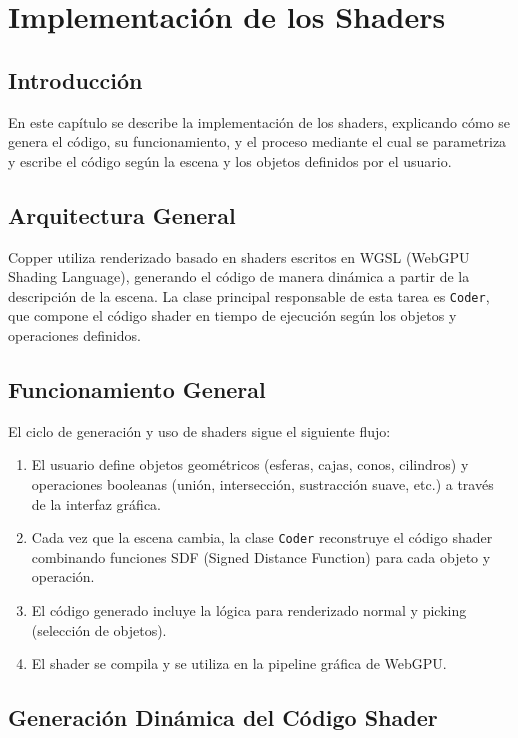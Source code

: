\chapter{Implementación de los Shaders}

\section{Introducción}

En este capítulo se describe la implementación de los shaders, explicando cómo
se genera el código, su funcionamiento, y el proceso mediante el cual se
parametriza y escribe el código según la escena y los objetos definidos por el
usuario.

\section{Arquitectura General}

Copper utiliza renderizado basado en shaders escritos en WGSL (WebGPU Shading
Language), generando el código de manera dinámica a partir de la descripción de
la escena. La clase principal responsable de esta tarea es \texttt{Coder}, que
compone el código shader en tiempo de ejecución según los objetos y operaciones
definidos.

\section{Funcionamiento General}

El ciclo de generación y uso de shaders sigue el siguiente flujo:

\begin{enumerate}
    \item El usuario define objetos geométricos (esferas, cajas, conos, cilindros) y
          operaciones booleanas (unión, intersección, sustracción suave, etc.) a través
          de la interfaz gráfica.
    \item Cada vez que la escena cambia, la clase \texttt{Coder} reconstruye el código
          shader combinando funciones SDF (Signed Distance Function) para cada objeto y
          operación.
    \item El código generado incluye la lógica para renderizado normal y picking
          (selección de objetos).
    \item El shader se compila y se utiliza en la pipeline gráfica de WebGPU.
\end{enumerate}

\section{Generación Dinámica del Código Shader}

